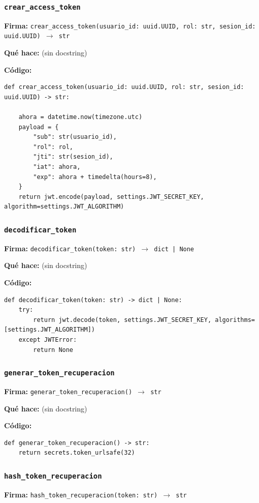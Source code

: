 \documentclass[11pt,a4paper]{article}
\begin{document}
\subsubsection*{\texttt{crear\_access\_token}}
\textbf{Firma:} \texttt{crear\_access\_token(usuario\_id: uuid.UUID, rol: str, sesion\_id: uuid.UUID) $\rightarrow$ str}

\textbf{Qué hace:} (sin docstring)

\textbf{Código:}
\begin{lstlisting}
def crear_access_token(usuario_id: uuid.UUID, rol: str, sesion_id: uuid.UUID) -> str:

    ahora = datetime.now(timezone.utc)
    payload = {
        "sub": str(usuario_id),
        "rol": rol,
        "jti": str(sesion_id),
        "iat": ahora,
        "exp": ahora + timedelta(hours=8),
    }
    return jwt.encode(payload, settings.JWT_SECRET_KEY, algorithm=settings.JWT_ALGORITHM)
\end{lstlisting}

\subsubsection*{\texttt{decodificar\_token}}
\textbf{Firma:} \texttt{decodificar\_token(token: str) $\rightarrow$ dict | None}

\textbf{Qué hace:} (sin docstring)

\textbf{Código:}
\begin{lstlisting}
def decodificar_token(token: str) -> dict | None:
    try:
        return jwt.decode(token, settings.JWT_SECRET_KEY, algorithms=[settings.JWT_ALGORITHM])
    except JWTError:
        return None
\end{lstlisting}

\subsubsection*{\texttt{generar\_token\_recuperacion}}
\textbf{Firma:} \texttt{generar\_token\_recuperacion() $\rightarrow$ str}

\textbf{Qué hace:} (sin docstring)

\textbf{Código:}
\begin{lstlisting}
def generar_token_recuperacion() -> str:
    return secrets.token_urlsafe(32)
\end{lstlisting}

\subsubsection*{\texttt{hash\_token\_recuperacion}}
\textbf{Firma:} \texttt{hash\_token\_recuperacion(token: str) $\rightarrow$ str}
\end{document}
